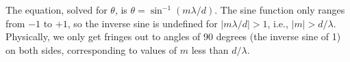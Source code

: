 The equation, solved for $\theta$, is
$\theta=\sin^{-1}(m\lambda/d)$. The sine
function only ranges from $-1$ to $+1$, so
the inverse sine is undefined for
$|m\lambda/d|>1$, i.e., $|m|>d/\lambda$.
Physically, we only get fringes out to angles of
90 degrees (the inverse sine of 1) 
on both sides, corresponding to
values of $m$ less than $d/\lambda$.
